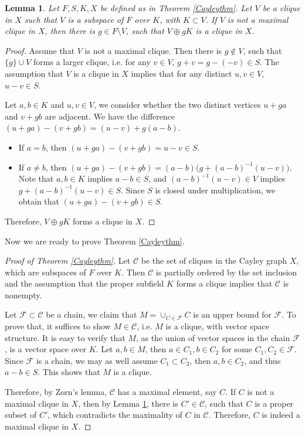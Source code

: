 \documentclass[12pt,oneside]{amsart}
\newtheorem{lem}[thm]{Lemma}
\newcommand{\CC}{\mathcal{C}}
\newcommand{\FF}{\mathcal{F}}
\begin{document}
\begin{lem}\label{Caylem}
Let $F,S,K,X$ be defined as in Theorem \ref{Cayleythm}. Let $V$ be a clique in $X$ such that $V$ is a subspace of $F$ over $K$, with $K \subset V$. If $V$ is not a maximal clique in $X$, then there is $g \in F \setminus V$, such that $V \oplus gK$ is a clique in $X$. 
\end{lem}

\begin{proof}
Assume that $V$ is not a maximal clique. Then there is $g \notin V$, such that $\{g\} \cup V$ forms a larger clique, i.e. for any $v \in V$, $g+v=g-(-v) \in S$. The assumption that $V$ is a clique in $X$ implies that for any distinct $u,v \in V$, $u-v \in S$. 

Let $a,b \in K$ and $u,v \in V$, we consider whether the two distinct vertices $u+ga$ and $v+gb$ are adjacent. We have the difference
$
(u+ga)-(v+gb)=(u-v)+g(a-b).
$
\begin{itemize}
    \item If $a=b$, then $(u+ga)-(v+gb)=u-v \in S.$
    \item If $a \neq b$, then $(u+ga)-(v+gb)=(a-b) \big(g+ (a-b)^{-1} (u-v)\big)$. Note that $a,b \in K$ implies $a-b \in S$, and $(a-b)^{-1}(u-v) \in V$ implies $g+ (a-b)^{-1} (u-v) \in S$. Since $S$ is closed under multiplication, we obtain that $(u+ga)-(v+gb) \in S$.
\end{itemize}
Therefore, $V \oplus gK$ forms a clique in $X$.
\end{proof}

Now we are ready to prove Theorem \ref{Cayleythm}.

\begin{proof}[Proof of Theorem \ref{Cayleythm}]
Let $\CC$ be the set of cliques in the Cayley graph $X$, which are subspaces of $F$ over $K$. Then $\CC$ is partially ordered by the set inclusion and the assumption that the proper subfield $K$ forms a clique implies that $\CC$ is nonempty.

Let $\FF \subset \CC$ be a chain, we claim that $M=\cup_{C \in \FF} C$ is an upper bound for $\FF$. To prove that, it suffices to show $M \in \CC$, i.e. $M$ is a clique, with vector space structure. It is easy to verify that $M$, as the union of vector spaces in the chain $\FF$, is a vector space over $K$. Let $a, b \in M$, then $a \in C_1, b \in C_2$ for some $C_1, C_2 \in \FF$. Since $\FF$ is a chain, we may as well assume $C_1 \subset C_2$, then $a,b \in C_2$, and thus $a-b \in S$. This shows that $M$ is a clique.

Therefore, by Zorn's lemma, $\CC$ has a maximal element, say $C$. If $C$ is not a maximal clique in $X$, then by Lemma \ref{Caylem}, there is $C' \in \CC$, such that $C$ is a proper subset of $C'$, which contradicts the maximality of $C$ in $\CC$. Therefore, $C$ is indeed a maximal clique in $X$. 
\end{proof}
\end{document}
